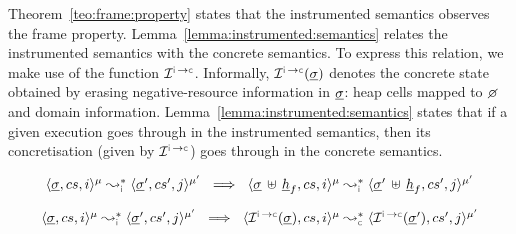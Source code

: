 Theorem~\ref{teo:frame:property} states that the \jsil instrumented semantics observes the 
frame property. Lemma~\ref{lemma:instrumented:semantics} relates the instrumented 
semantics with the concrete semantics. To express this relation, we make 
use of the function  $\interpret{\instconc}{}$. Informally,   $\interpret{\instconc}{}(\istate)$
denotes the concrete state obtained by erasing negative-resource information in $\underline{\sigma}$: 
heap cells mapped to $\none$ and domain information. 
Lemma~\ref{lemma:instrumented:semantics} states that if a given execution 
goes through in the instrumented semantics, then its concretisation (given by $\interpret{\instconc}{}$) 
goes through in the concrete semantics. 

\begin{theorem}\label{teo:frame:property}
$$
\begin{array}{l}
\transabssemrule{\istate, \cs, i}{\istate', \cs', j}{\mode}{\mode'}{\instrumented} 
       \ \implies \ 
        \transabssemrule{\istate \dunion \iheap_f, \cs, i}{\istate' \dunion \iheap_f, \cs', j}{\mode}{\mode'}{\instrumented} 
\end{array}
$$
\end{theorem}

\begin{lemma}\label{lemma:instrumented:semantics}
$$
\begin{array}{l}
\transabssemrule{\istate, \cs, i}{\istate', \cs', j}{\mode}{\mode'}{\instrumented} 
       \ \implies \ 
        \transabssemrule{\interpret{\instconc}{}(\istate), \cs, i}{\interpret{\instconc}{}(\istate'), \cs', j}{\mode}{\mode'}{\concrete} 
\end{array}
$$
\end{lemma}



%


